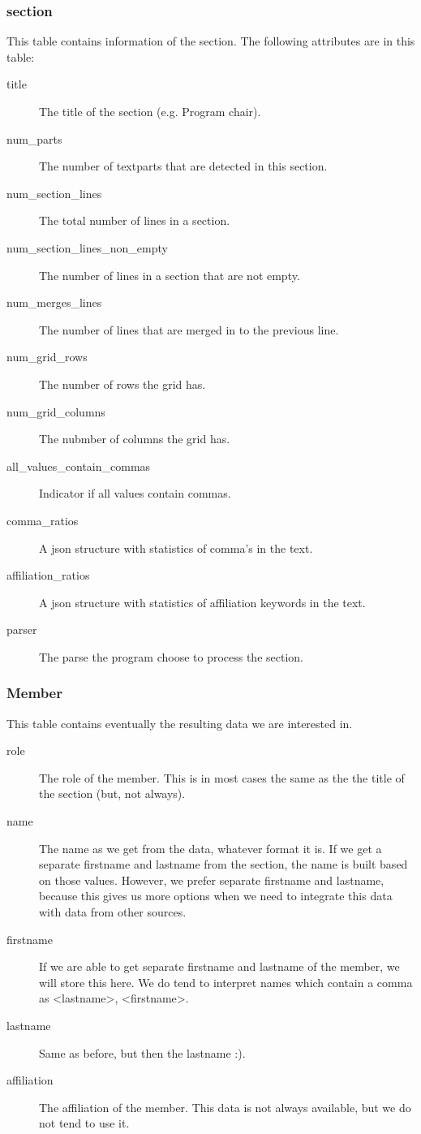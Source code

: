 \documentclass{ou-report}
\begin{document}
\subsubsection{section}
This table contains information of the section. The following attributes are in 
this table:
\begin{description}
    \item[title] The title of the section (e.g. Program chair).
    \item[num\_parts] The number of textparts that are detected in this section.
    \item[num\_section\_lines] The total number of lines in a section.
    \item[num\_section\_lines\_non\_empty] The number of lines in a section that
        are not empty.
    \item[num\_merges\_lines] The number of lines that are merged in to the 
        previous line.
    \item[num\_grid\_rows] The number of rows the grid has.
    \item[num\_grid\_columns] The nubmber of columns the grid has.
    \item[all\_values\_contain\_commas] Indicator if all values contain commas.
    \item[comma\_ratios] A json structure with statistics of comma's in the text.
    \item[affiliation\_ratios] A json structure with statistics of affiliation 
        keywords in the text.
    \item[parser] The parse the program choose to process the section.
\end{description}

\subsubsection{Member}
This table contains eventually the resulting data we are interested in.
\begin{description}
    \item[role] The role of the member. This is in most cases the same as the 
        the title of the section (but, not always). 
    \item[name] The name as we get from the data, whatever format it is. If we
        get a separate firstname and lastname from the section, the name is 
        built based on those values. However, we prefer separate firstname and
        lastname, because this gives us more options when we need to integrate
        this data with data from other sources.
    \item[firstname] If we are able to get separate firstname and lastname of
        the member, we will store this here. We do tend to interpret names which 
        contain a comma as <lastname>, <firstname>.
    \item[lastname] Same as before, but then the lastname :).
    \item[affiliation] The affiliation of the member. This data is not always
        available, but we do not tend to use it.
\end{description}
\end{document}
